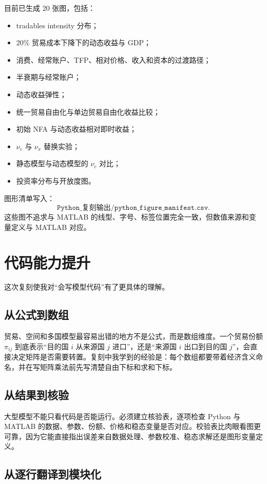 \documentclass[UTF8,12pt,a4paper]{ctexart}
\begin{document}
目前已生成 20 张图，包括：
\begin{itemize}
  \item tradables intensity 分布；
  \item 20\% 贸易成本下降下的动态收益与 GDP；
  \item 消费、经常账户、TFP、相对价格、收入和资本的过渡路径；
  \item 半衰期与经常账户；
  \item 动态收益弹性；
  \item 统一贸易自由化与单边贸易自由化收益比较；
  \item 初始 NFA 与动态收益相对即时收益；
  \item $\nu_c$ 与 $\nu_x$ 替换实验；
  \item 静态模型与动态模型的 $\nu_c$ 对比；
  \item 投资率分布与开放度图。
\end{itemize}

图形清单写入：
\[
\texttt{Python\_复刻输出/python\_figure\_manifest.csv}.
\]
这些图不追求与 MATLAB 的线型、字号、标签位置完全一致，但数值来源和变量定义与 MATLAB 对应。

\section{代码能力提升}

这次复刻使我对“会写模型代码”有了更具体的理解。

\subsection{从公式到数组}

贸易、空间和多国模型最容易出错的地方不是公式，而是数组维度。一个贸易份额 $\pi_{ij}$ 到底表示“目的国 $i$ 从来源国 $j$ 进口”，还是“来源国 $i$ 出口到目的国 $j$”，会直接决定矩阵是否需要转置。复刻中我学到的经验是：每个数组都要带着经济含义命名，并在写矩阵乘法前先写清楚自由下标和求和下标。

\subsection{从结果到核验}

大型模型不能只看代码是否能运行。必须建立核验表，逐项检查 Python 与 MATLAB 的数据、参数、份额、价格和稳态变量是否对应。校验表比肉眼看图更可靠，因为它能直接指出误差来自数据处理、参数校准、稳态求解还是图形变量定义。

\subsection{从逐行翻译到模块化}
\end{document}
